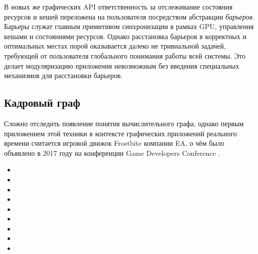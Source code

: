 В новых же графических API ответственность за отслеживание состояния ресурсов и кешей переложена на пользователя посредством абстракции \textit{барьеров}. Барьеры служат главным примитивом синхронизации в рамках GPU, управления кешами и состояниями ресурсов. Однако расстановка барьеров в корректных и оптимальных местах порой оказывается далеко не тривиальной задачей, требующей от пользователя глобального понимания работы всей системы. Это делает модуляризацию приложения невозможным без введения специальных механизмов для расстановки барьеров.

\subsection{Кадровый граф}
Сложно отследить появление понятия вычислительного графа, однако первым приложением этой техники в контексте графических приложений реального времени считается игровой движок Frostbite компании EA, о чём было объявлено в 2017 году на конференции Game Developers Conference \cite{FrostbiteGdcTalk}.
\begin{itemize}
\item {}
\item {}
\item {}
\item {}
\item {}
\item {}
\item {}
\item {}
\item {}
\end{itemize}
